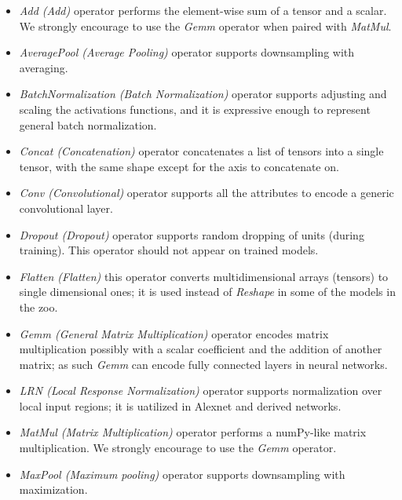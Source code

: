 \begin{itemize}
	\item \emph{Add (Add)} operator performs the element-wise sum of
		a tensor and a scalar. We strongly encourage to use the 
		\textit{Gemm} operator when paired with \textit{MatMul}.
	
	\item \emph{AveragePool (Average Pooling)} operator
	  supports downsampling with averaging.
	
	\item \emph{BatchNormalization (Batch
	  Normalization)} operator supports adjusting and scaling the
	  activations functions, and it is expressive enough to represent
	  general batch normalization.
	  
	\item \emph{Concat (Concatenation)} operator concatenates a list
		of tensors into a single tensor, with the same shape except for
		the axis to concatenate on.	
	
	\item \emph{Conv (Convolutional)} operator supports
	  all the attributes to encode a generic convolutional layer.
	
	\item \emph{Dropout (Dropout)} operator supports
	  random dropping of units (during training). This operator should not
	  appear on trained models.  
	  
	\item \emph{Flatten (Flatten)} this operator converts multidimensional
	  arrays (tensors) to single dimensional ones; it is used instead of
	  \emph{Reshape} in some of the models in the zoo.
	  
	\item \emph{Gemm (General Matrix Multiplication)}
	  operator encodes matrix multiplication possibly with a scalar
	  coefficient and the addition of another matrix; as such \emph{Gemm}
	  can encode fully connected layers in neural networks.
	
	\item \emph{LRN (Local Response Normalization)}
	  operator supports normalization over local input regions; it is uatilized
	  in Alexnet and derived networks.
	  
	\item \emph{MatMul (Matrix Multiplication)} operator performs a
		numPy-like matrix multiplication. We strongly encourage to use
		the \textit{Gemm} operator.
	  
	\item \emph{MaxPool (Maximum pooling)} operator supports
	  downsampling with maximization.
	

\end{itemize}
